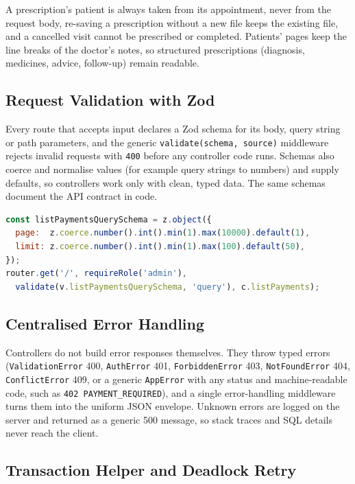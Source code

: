 A prescription's patient is always taken from its appointment, never from the request body, re-saving a prescription without a new file keeps the existing file, and a cancelled visit cannot be prescribed or completed. Patients' pages keep the line breaks of the doctor's notes, so structured prescriptions (diagnosis, medicines, advice, follow-up) remain readable.

\FloatBarrier
\subsection{Request Validation with Zod}

Every route that accepts input declares a Zod schema for its body, query string or path parameters, and the generic \texttt{validate(schema, source)} middleware rejects invalid requests with \texttt{400} before any controller code runs. Schemas also coerce and normalise values (for example query strings to numbers) and supply defaults, so controllers work only with clean, typed data. The same schemas document the API contract in code.

\begin{lstlisting}[language=JavaScript, caption=Validation Schema and Route (payments)]
const listPaymentsQuerySchema = z.object({
  page:  z.coerce.number().int().min(1).max(10000).default(1),
  limit: z.coerce.number().int().min(1).max(100).default(50),
});
router.get('/', requireRole('admin'),
  validate(v.listPaymentsQuerySchema, 'query'), c.listPayments);
\end{lstlisting}

\FloatBarrier
\subsection{Centralised Error Handling}

Controllers do not build error responses themselves. They throw typed errors (\texttt{ValidationError} 400, \texttt{AuthError} 401, \texttt{ForbiddenError} 403, \texttt{NotFoundError} 404, \texttt{ConflictError} 409, or a generic \texttt{AppError} with any status and machine-readable code, such as \texttt{402 PAYMENT\_REQUIRED}), and a single error-handling middleware turns them into the uniform JSON envelope. Unknown errors are logged on the server and returned as a generic 500 message, so stack traces and SQL details never reach the client.

\FloatBarrier
\subsection{Transaction Helper and Deadlock Retry}
\label{sec:txhelper}

